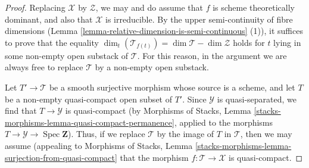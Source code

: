 \documentclass[10pt,a4paper]{amsart}
\theoremstyle{plain}
\theoremstyle{definition}
\theoremstyle{remark}
\numberwithin{equation}{subsection}
\def\Spec{\mathop{\mathrm{Spec}}}
\begin{document}
\begin{proof}
Replacing $\mathcal{X}$ by $\mathcal{Z}$, we may and do assume that $f$ is
scheme theoretically dominant,
and also that $\mathcal{X}$ is irreducible.
By the upper semi-continuity of fibre dimensions
(Lemma \ref{lemma-relative-dimension-is-semi-continuous} (1)),
it suffices to prove that the equality
$\dim_t( \mathcal{T}_{f(t)}) =\dim \mathcal{T}  - \dim \mathcal{Z}$
holds for $t$ lying in
some non-empty open substack of $\mathcal{T}$.
For this reason, in the argument we are always free
to replace $\mathcal{T}$ by a non-empty open substack.

\medskip\noindent
Let $T' \to \mathcal{T}$ be a smooth surjective morphism whose source
is a scheme, and let $T$ be a non-empty quasi-compact open subset
of $T'$.  Since $\mathcal{Y}$ is quasi-separated, we find
that $T \to  \mathcal{Y}$ is quasi-compact
(by Morphisms of Stacks, Lemma
\ref{stacks-morphisms-lemma-quasi-compact-permanence}, applied to the morphisms
$T \to \mathcal{Y} \to \Spec \mathbf{Z}$).
Thus, if we replace $\mathcal{T}$ by the image of $T$ in $\mathcal{T}$,
then we may assume (appealing to
Morphisms of Stacks, Lemma
\ref{stacks-morphisms-lemma-surjection-from-quasi-compact}
that the morphism $f:\mathcal{T} \to \mathcal{X}$ is quasi-compact.


\end{proof}
\end{document}
